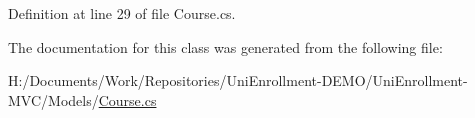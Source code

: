 Definition at line 29 of file Course.\+cs.



The documentation for this class was generated from the following file\+:\begin{DoxyCompactItemize}
\item 
H\+:/\+Documents/\+Work/\+Repositories/\+Uni\+Enrollment-\/\+D\+E\+M\+O/\+Uni\+Enrollment-\/\+M\+V\+C/\+Models/\hyperlink{_course_8cs}{Course.\+cs}\end{DoxyCompactItemize}
